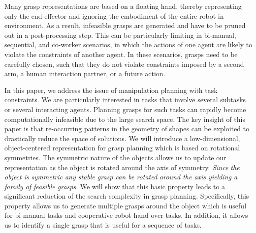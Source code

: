 \documentclass{aamas2015}
\begin{document}
Many grasp representations are based on a floating hand, thereby representing only the
end-effector and ignoring the embodiment of the entire robot in environment. As a result, infeasible
grasps are generated and have to be pruned out in a post-processing step. This can be particularly
limiting in bi-manual, sequential, and co-worker scenarios, in which the actions of one agent are likely to violate the constraints of another agent. In these scenarios, grasps need to be carefully chosen, such that they do not violate constraints imposed by a second arm, a human interaction partner, or a future action. 

In this paper, we address the issue of manipulation planning with task constraints. We are
particularly interested in tasks that involve several subtasks or several interacting agents.
Planning grasps for such tasks can rapidly become computationally infeasible due to the large search
space. The key insight of this paper is that re-occurring patterns in the geometry of shapes can be
exploited to drastically reduce the space of solutions. We will introduce a low-dimensional,
object-centered representation for grasp planning which is based on rotational symmetries. The
symmetric nature of the objects allows us to update our representation as the object is rotated around
the axis of symmetry. \emph{Since the object is symmetric any stable grasp can be rotated around the
axis yielding a family of feasible grasps}. We will show that this basic property leads to a
significant reduction of the search complexity in grasp planning. Specifically, this property allows us
to generate multiple grasps around the object which is useful for bi-manual tasks and cooperative
robot hand over tasks. In addition, it allows us to identify a single grasp that is useful for a
sequence of tasks.
\end{document}
